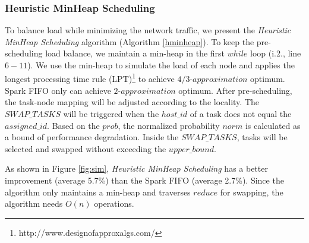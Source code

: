 \subsubsection{Heuristic MinHeap Scheduling}\label{h-minheap}
To balance load while minimizing the network traffic, we present the \textit{Heuristic MinHeap Scheduling} algorithm (Algorithm \ref{hminheap}).
{\color{blue}
To keep the pre-scheduling load balance, we maintain a min-heap in the first $while$ loop (i.2., line $6-11$).
We use the min-heap to simulate the load of each node and applies the longest processing time rule (LPT)\footnote{http://www.designofapproxalgs.com/} to achieve $4/3\text{-}approximation$ optimum.
Spark FIFO only can achieve $2\text{-}approximation$ optimum.
}
After pre-scheduling, the task-node mapping will be adjusted according to the locality. 
The $SWAP\_TASKS$ will be triggered when the $host\_id$ of a task does not equal the $assigned\_id$.
Based on the $prob$, the normalized probability $norm$ is calculated as a bound of performance degradation. 
Inside the $SWAP\_TASKS$, tasks will be selected and swapped without exceeding the $upper\_bound$. 

{\color{blue}
As shown in Figure \ref{fig:sim}, \textit{Heuristic MinHeap Scheduling} has a better improvement (average 5.7\%) than the Spark FIFO (average 2.7\%).
Since the algorithm only maintains a min-heap and traverses $reduce$ for swapping, the algorithm needs $O(n)$ operations.
}

